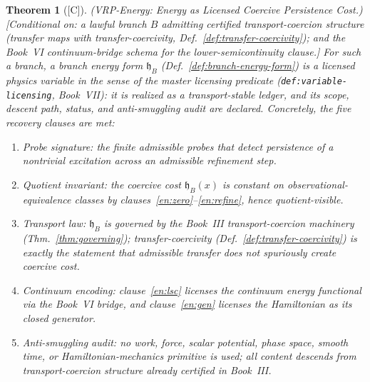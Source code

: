 \documentclass[12pt,oneside]{amsbook}
\theoremstyle{plain}
\newtheorem{theorem}{Theorem}[section]
\theoremstyle{definition}
\theoremstyle{remark}
\newcommand{\status}[1]{\textup{[#1]}}
\begin{document}
\begin{theorem}[\status{C}]\label{thm:vrp-energy}
\textup{(VRP-Energy: Energy as Licensed Coercive Persistence Cost.)}
\textup{[Conditional on: a lawful branch $B$ admitting certified
transport-coercion structure (transfer maps with
transfer-coercivity, Def.~\ref{def:transfer-coercivity}); and the
Book~VI continuum-bridge schema for the lower-semicontinuity
clause.]}
For such a branch, a branch energy form $\mathfrak{h}_B$
(Def.~\ref{def:branch-energy-form}) is a \emph{licensed} physics
variable in the sense of the master licensing predicate
(\texttt{def:variable-licensing}, Book~VII): it is realized as a
transport-stable ledger, and its scope, descent path, status, and
anti-smuggling audit are declared.  Concretely, the five recovery
clauses are met:
\begin{enumerate}[label=\textup{(\arabic*)}]
  \item \emph{Probe signature:} the finite admissible probes that
    detect persistence of a nontrivial excitation across an
    admissible refinement step.
  \item \emph{Quotient invariant:} the coercive cost
    $\mathfrak{h}_B(x)$ is constant on observational-equivalence
    classes by clauses~\ref{en:zero}--\ref{en:refine}, hence
    quotient-visible.
  \item \emph{Transport law:} $\mathfrak{h}_B$ is governed by the
    Book~III transport-coercion machinery
    (Thm.~\ref{thm:governing}); transfer-coercivity
    (Def.~\ref{def:transfer-coercivity}) is exactly the statement
    that admissible transfer does not spuriously create coercive
    cost.
  \item \emph{Continuum encoding:} clause~\ref{en:lsc} licenses
    the continuum energy functional via the Book~VI bridge, and
    clause~\ref{en:gen} licenses the Hamiltonian as its closed
    generator.
  \item \emph{Anti-smuggling audit:} no work, force, scalar
    potential, phase space, smooth time, or Hamiltonian-mechanics
    primitive is used; all content descends from transport-coercion
    structure already certified in Book~III.
\end{enumerate}
\end{theorem}
\end{document}
